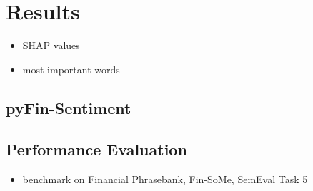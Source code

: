 \section{Results}


\begin{itemize}[noitemsep]
	\item SHAP values
	\item most important words
\end{itemize}


\subsection{pyFin-Sentiment}


\subsection{Performance Evaluation}

\begin{itemize}[noitemsep]
	\item benchmark on Financial Phrasebank, Fin-SoMe, SemEval Task 5
\end{itemize}